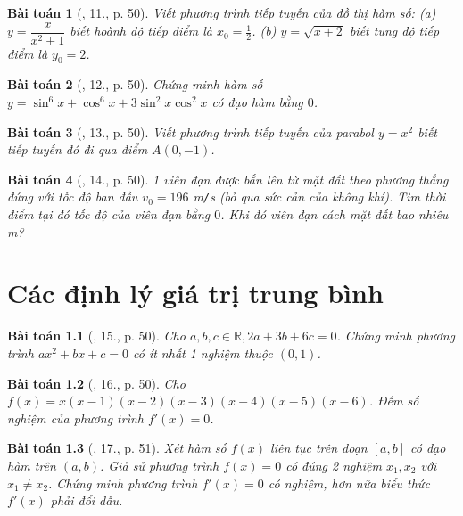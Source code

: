 \documentclass[oneside]{book}
\newtheorem{baitoan}{Bài toán}
\begin{document}
\begin{baitoan}[\cite{TLCT_BT_dai_so_giai_tich_11}, 11., p. 50]
	Viết phương trình tiếp tuyến của đồ thị hàm số: (a) $y = \dfrac{x}{x^2 + 1}$ biết hoành độ tiếp điểm là $x_0 = \frac{1}{2}$. (b) $y = \sqrt{x + 2}$ biết tung độ tiếp điểm là $y_0 = 2$.
\end{baitoan}

\begin{baitoan}[\cite{TLCT_BT_dai_so_giai_tich_11}, 12., p. 50]
	Chứng minh hàm số $y = \sin^6x + \cos^6x + 3\sin^2x\cos^2x$ có đạo hàm bằng $0$.
\end{baitoan}

\begin{baitoan}[\cite{TLCT_BT_dai_so_giai_tich_11}, 13., p. 50]
	Viết phương trình tiếp tuyến của parabol $y = x^2$ biết tiếp tuyến đó đi qua điểm $A(0,-1)$.
\end{baitoan}

\begin{baitoan}[\cite{TLCT_BT_dai_so_giai_tich_11}, 14., p. 50]
	1 viên đạn được bắn lên từ mặt đất theo phương thẳng đứng với tốc độ ban đầu $v_0 = 196$ {\rm m{\tt/}s} (bỏ qua sức cản của không khí). Tìm thời điểm tại đó tốc độ của viên đạn bằng $0$. Khi đó viên đạn cách mặt đất bao nhiêu {\rm m}?
\end{baitoan}


\chapter{Các định lý giá trị trung bình}
\minitoc

\begin{baitoan}[\cite{TLCT_BT_dai_so_giai_tich_11}, 15., p. 50]
	Cho $a,b,c\in\mathbb{R},2a + 3b + 6c = 0$. Chứng minh phương trình $ax^2 + bx + c = 0$ có ít nhất 1 nghiệm thuộc $(0,1)$.
\end{baitoan}

\begin{baitoan}[\cite{TLCT_BT_dai_so_giai_tich_11}, 16., p. 50]
	Cho $f(x) = x(x - 1)(x - 2)(x - 3)(x - 4)(x - 5)(x - 6)$. Đếm số nghiệm của phương trình $f'(x) = 0$.
\end{baitoan}

\begin{baitoan}[\cite{TLCT_BT_dai_so_giai_tich_11}, 17., p. 51]
	Xét hàm số $f(x)$ liên tục trên đoạn $[a,b]$ có đạo hàm trên $(a,b)$. Giả sử phương trình $f(x) = 0$ có đúng 2 nghiệm $x_1,x_2$ với $x_1\ne x_2$. Chứng minh phương trình $f'(x) = 0$ có nghiệm, hơn nữa biểu thức $f'(x)$ phải đổi dấu.
\end{baitoan}
\end{document}
